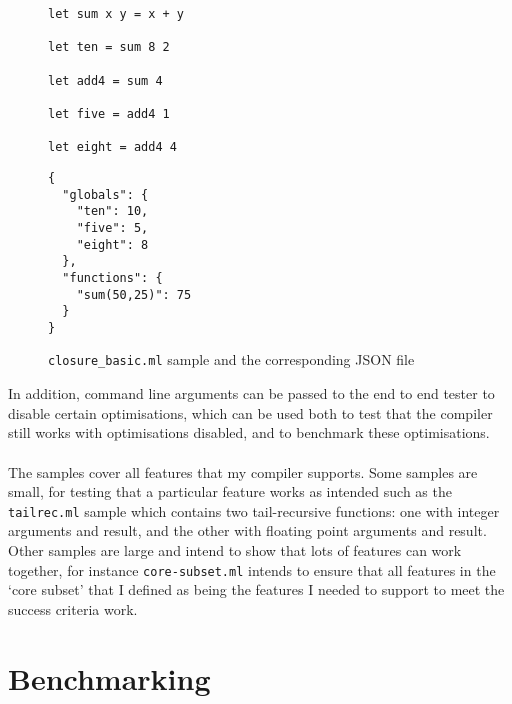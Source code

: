 \documentclass[12pt,twoside,notitlepage]{report}
\newcommand{\textinline}{\texttt}
\newcommand{\cfbox}[2]{%
	\colorlet{currentcolor}{.}%
	{\color{#1}%
		\fbox{\color{currentcolor}#2}}%
}
\newcommand\note[1]{\noindent\cfbox{blue}{\parbox{\textwidth}{\textcolor{blue}{#1}}}}
\begin{document}
\begin{figure}[h]
	\begin{minipage}[t]{0.5\linewidth}
		\begin{verbatim}
let sum x y = x + y

let ten = sum 8 2

let add4 = sum 4

let five = add4 1

let eight = add4 4
		\end{verbatim}
	\end{minipage}
	\begin{minipage}[t]{0.5\linewidth}
		\begin{verbatim}
{
  "globals": {
    "ten": 10,
    "five": 5,
    "eight": 8
  },
  "functions": {
    "sum(50,25)": 75
  }
}
		\end{verbatim}
	\end{minipage}
	\caption{\textinline{closure_basic.ml} sample and the corresponding JSON file}
	\label{fig:sample}
\end{figure}
In addition, command line arguments can be passed to the end to end tester to disable certain optimisations, which can be used both to test that the compiler still works with optimisations disabled, and to benchmark these optimisations.
\\\\
The samples cover all features that my compiler supports. Some samples are small, for testing that a particular feature works as intended such as the \textinline{tailrec.ml} sample which contains two tail-recursive functions: one with integer arguments and result, and the other with floating point arguments and result. Other samples are large and intend to show that lots of features can work together, for instance \textinline{core-subset.ml} intends to ensure that all features in the `core subset' that I defined as being the features I needed to support to meet the success criteria work.

\section{Benchmarking}
\note{
	\begin{itemize}
		\item Gcd: main target of optimisations. Went from 122ms to 8ms thanks to all of them.
		\item others: they improve (e.g. especially with direct call generation), but not as much with the other optimisations
		\item Make some performance graphs of the final result vs other execution engines, and of different optimisations enabled/disabled (can do both time and memory for that).
	\end{itemize}
}
\end{document}
